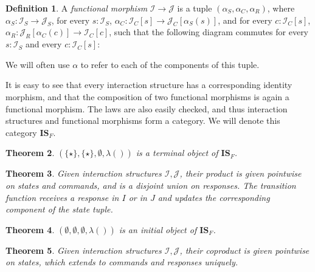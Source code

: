 \documentclass{article}
\newtheorem{theorem}{Theorem}
\theoremstyle{definition}
\newtheorem{definition}[theorem]{Definition}
\newcommand{\mc}[1]{\mathcal{#1}}
\newcommand{\iss}[1]{\mathcal{#1}_S}
\newcommand{\isc}[1]{\mathcal{#1}_C}
\newcommand{\isr}[1]{\mathcal{#1}_R}
\begin{document}
    \begin{definition}
        A \emph{functional morphism} $\mc I \to \mc J$ is a tuple $(\alpha_S, \alpha_C, \alpha_R)$, where $\alpha_S :
        \iss I \to \iss J$, for every $s : \iss I$, $\alpha_C : \isc I [s] \to \isc J [\alpha_S(s)]$, and for every $c :
        \isc I [s]$, $\alpha_R : \isr J [\alpha_C(c)] \to \isc I [c]$, such that the following diagram commutes for
        every $s : \iss I$ and every $c : \isc I [s]$:
        \begin{center}
        \end{center}
    \end{definition}

    We will often use $\alpha$ to refer to each of the components of this tuple.

    It is easy to see that every interaction structure has a corresponding identity morphism, and that the composition
    of two functional morphisms is again a functional morphism.  The laws are also easily checked, and thus interaction
    structures and functional morphisms form a category.  We will denote this category $\mathbf{IS}_F$.

    \begin{theorem}
        $(\{\star\}, \{\star\}, \emptyset, \lambda ())$ is a terminal object of $\mathbf{IS}_F$.
    \end{theorem}

    \begin{theorem}
        Given interaction structures $\mc I, \mc J$, their product is given pointwise on states and commands, and is a
        disjoint union on responses.  The transition function receives a response in $I$ or in $J$ and updates the
        corresponding component of the state tuple.
    \end{theorem}

    \begin{theorem}
        $(\emptyset, \emptyset, \emptyset, \lambda ())$ is an initial object of $\mathbf{IS}_F$.
    \end{theorem}

    \begin{theorem}
        Given interaction structures $\mc I, \mc J$, their coproduct is given pointwise on states, which extends to
        commands and responses uniquely.
    \end{theorem}
\end{document}
